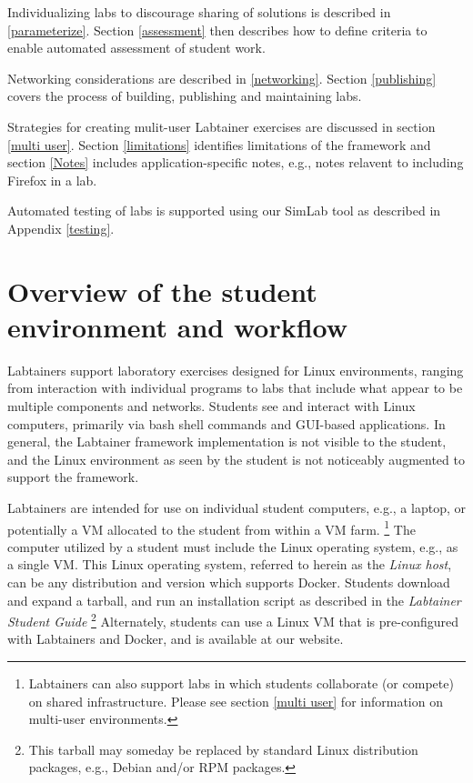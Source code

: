 \documentclass[12pt]{article}
\begin{document}
Individualizing labs to discourage sharing of solutions is described in \ref{parameterize}.
Section \ref{assessment} then describes how to define criteria to enable automated assessment
of student work.  

Networking considerations are described in \ref{networking}.  Section \ref{publishing} covers
the process of building, publishing and maintaining labs.

Strategies for creating mulit-user Labtainer exercises are discussed in section \ref{multi user}.
Section \ref{limitations} identifies limitations of the framework and section \ref{Notes} includes
application-specific notes, e.g., notes relavent to including Firefox in a lab.

Automated testing of labs is supported using our SimLab tool as described in Appendix \ref{testing}.


\section {Overview of the student environment and workflow}
\label{student environment}
Labtainers support laboratory exercises designed for Linux environments,
ranging from interaction with individual programs to labs that include
what appear to be multiple components and networks.  Students see and interact with Linux
computers, primarily via bash shell commands and GUI-based applications. In general, the Labtainer
framework implementation is not visible to the student, and the Linux
environment as seen by the student is not noticeably augmented to support the framework.

Labtainers are intended for use on individual student computers, e.g., a laptop,
or potentially a VM allocated to the student from within a VM farm. \footnote{Labtainers
can also support labs in which students collaborate (or compete) on shared infrastructure.
Please see section \ref{multi user} for information on multi-user environments.}
The computer utilized by a student must include the Linux operating system, e.g.,
as a single VM.  This Linux operating system, referred to herein
as the \textit{Linux host}, can be any distribution and version
which supports Docker.  Students download and expand a tarball, and run
an installation script as described in the \textit{Labtainer Student Guide}
\footnote{This tarball may someday be replaced by standard Linux distribution packages,
e.g., Debian and/or RPM packages.} Alternately, students can use a Linux VM
that is pre-configured with Labtainers and Docker, and is available at our website.
\end{document}
